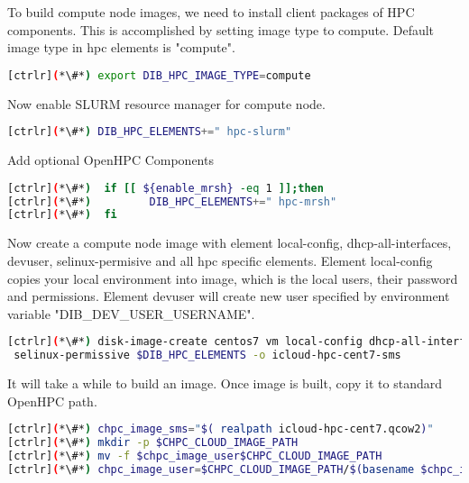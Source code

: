 To build compute node images, we need to install client packages of HPC components. This is accomplished by setting image type to compute. Default image type in hpc elements is "compute".


\begin{lstlisting}[language=bash,keywords={}]
[ctrlr](*\#*) export DIB_HPC_IMAGE_TYPE=compute
\end{lstlisting} 

Now enable SLURM resource manager for compute node.


\begin{lstlisting}[language=bash,keywords={}]
[ctrlr](*\#*) DIB_HPC_ELEMENTS+=" hpc-slurm"
\end{lstlisting} 

Add optional OpenHPC Components


\begin{lstlisting}[language=bash,keywords={}]
[ctrlr](*\#*)  if [[ ${enable_mrsh} -eq 1 ]];then
[ctrlr](*\#*)         DIB_HPC_ELEMENTS+=" hpc-mrsh"
[ctrlr](*\#*)  fi
\end{lstlisting} 

Now create a compute node image with element local-config, dhcp-all-interfaces, devuser, selinux-permisive and all hpc specific elements. Element local-config copies your local environment into image, which is the local users, their password and permissions. Element devuser will create new user specified by environment variable "DIB\_DEV\_USER\_USERNAME". 


\begin{lstlisting}[language=bash,keywords={}]
[ctrlr](*\#*) disk-image-create centos7 vm local-config dhcp-all-interfaces devuser \
 selinux-permissive $DIB_HPC_ELEMENTS -o icloud-hpc-cent7-sms
\end{lstlisting} 


It will take a while to build an image. Once image is built, copy it to standard OpenHPC path.


\begin{lstlisting}[language=bash,keywords={}]
[ctrlr](*\#*) chpc_image_sms="$( realpath icloud-hpc-cent7.qcow2)"
[ctrlr](*\#*) mkdir -p $CHPC_CLOUD_IMAGE_PATH
[ctrlr](*\#*) mv -f $chpc_image_user$CHPC_CLOUD_IMAGE_PATH
[ctrlr](*\#*) chpc_image_user=$CHPC_CLOUD_IMAGE_PATH/$(basename $chpc_image_sms)
\end{lstlisting} 

